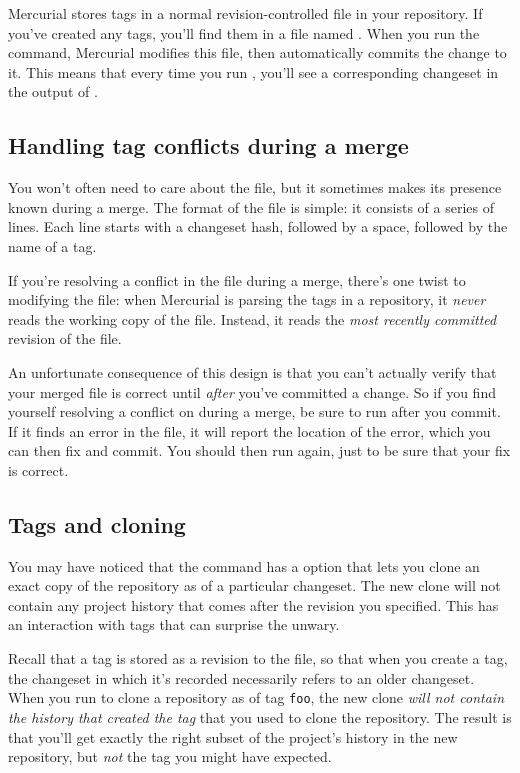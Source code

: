 Mercurial stores tags in a normal revision-controlled file in your
repository.  If you've created any tags, you'll find them in a file
named .  When you run the  command,
Mercurial modifies this file, then automatically commits the change to
it.  This means that every time you run , you'll see a
corresponding changeset in the output of .

\subsection{Handling tag conflicts during a merge}

You won't often need to care about the  file, but
it sometimes makes its presence known during a merge.  The format of
the file is simple: it consists of a series of lines.  Each line
starts with a changeset hash, followed by a space, followed by the
name of a tag.

If you're resolving a conflict in the  file during
a merge, there's one twist to modifying the  file:
when Mercurial is parsing the tags in a repository, it \emph{never}
reads the working copy of the  file.  Instead, it
reads the \emph{most recently committed} revision of the file.

An unfortunate consequence of this design is that you can't actually
verify that your merged  file is correct until
\emph{after} you've committed a change.  So if you find yourself
resolving a conflict on  during a merge, be sure to
run  after you commit.  If it finds an error in the
 file, it will report the location of the error,
which you can then fix and commit.  You should then run 
again, just to be sure that your fix is correct.

\subsection{Tags and cloning}

You may have noticed that the  command has a
 option that lets you clone an exact copy of the
repository as of a particular changeset.  The new clone will not
contain any project history that comes after the revision you
specified.  This has an interaction with tags that can surprise the
unwary.

Recall that a tag is stored as a revision to the 
file, so that when you create a tag, the changeset in which it's
recorded necessarily refers to an older changeset.  When you run
 to clone a repository as of tag
\texttt{foo}, the new clone \emph{will not contain the history that
  created the tag} that you used to clone the repository.  The result
is that you'll get exactly the right subset of the project's history
in the new repository, but \emph{not} the tag you might have expected.

